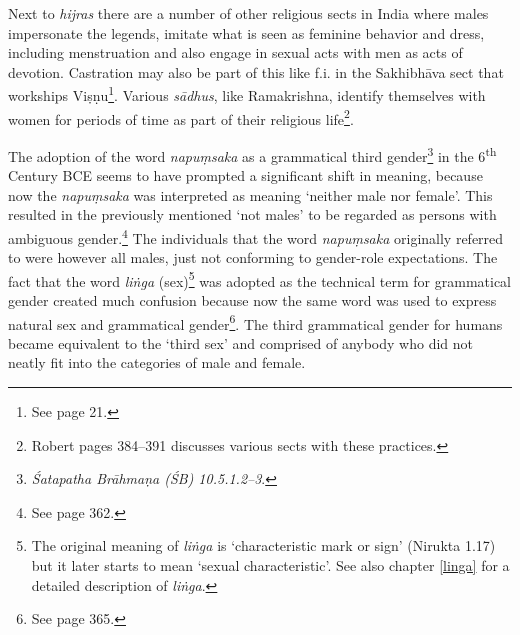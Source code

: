 Next to {\em hijras} there are a number of other religious sects in India where males impersonate the legends, imitate what is seen as feminine behavior and dress, including menstruation and also engage in sexual acts with men as acts of devotion. Castration may also be part of this like f.i. in the Sakhibhāva sect that workships Viṣṇu\footnote{See \cite{nanda} page 21.}. Various {\em sādhus}, like Ramakrishna, identify themselves with women for periods of time as part of their religious life\footnote{Robert \cite{goldman} pages 384–391 discusses various sects with these practices.}. 

The adoption of the word {\em napuṃsaka} as a grammatical third gender\footnote{{\em Śatapatha Brāhmaṇa (ŚB) 10.5.1.2–3}.} in the 6\textsuperscript{th} Century BCE seems to have prompted a significant shift in meaning, because now the {\em napuṃsaka} was interpreted as meaning `neither male nor female'. This resulted in the previously mentioned `not males' to be regarded as persons with ambiguous gender.\footnote{See \cite{zwilling2000} page 362.} The individuals that the word {\em napuṃsaka} originally referred to were however all males, just not conforming to gender-role expectations. The fact that the word {\em liṅga} (sex)\footnote{The original meaning of {\em liṅga} is `characteristic mark or sign' (Nirukta 1.17) but it later starts to mean `sexual characteristic'. See also chapter \ref{linga} for a detailed description of {\em liṅga}.} was adopted as the technical term for grammatical gender created much confusion because now the same word was used to express natural sex and grammatical gender\footnote{See \cite{zwilling} page 365.}. The third grammatical gender for humans became equivalent to the `third sex' and comprised of anybody who did not neatly fit into the categories of male and female.


